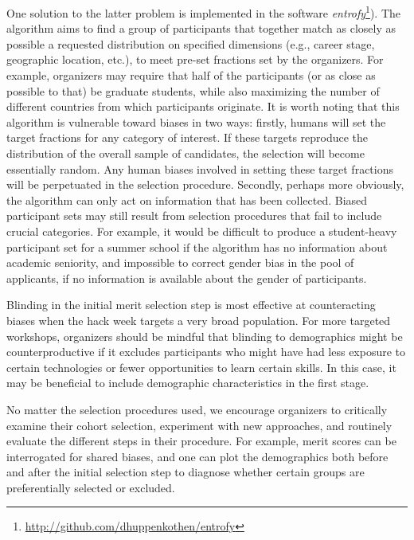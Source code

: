 One solution to the latter problem is implemented in the software \textit{entrofy}\footnote{\url{http://github.com/dhuppenkothen/entrofy}}). 
The algorithm aims to find a group of participants that together match as closely as possible a requested distribution on specified dimensions (e.g., career stage, geographic location, etc.), to meet pre-set fractions set by the organizers.
For example, organizers may require that half of the participants (or as close as possible to that) be graduate students, while also maximizing the number of different countries from which participants originate. 
It is worth noting that this algorithm is vulnerable toward biases in two ways: firstly, humans will set the target fractions for any category of interest.  
If these targets reproduce the distribution of the overall sample of candidates, the selection will become essentially random. 
Any human biases involved in setting these target fractions will be perpetuated in the selection procedure. 
Secondly, perhaps more obviously, the algorithm can only act on information that has been collected.
Biased participant sets may still result from selection procedures that fail to include crucial categories. For example, it would be difficult to produce a student-heavy participant set for a summer school if the algorithm has no information about academic seniority, and impossible to correct gender bias in the pool of applicants, if no information is available about the gender of participants.

Blinding in the initial merit selection step is most effective at counteracting biases when the hack week targets a very broad population. 
For more targeted workshops, organizers should be mindful that blinding to demographics might be counterproductive if it excludes participants who might have had less exposure to certain technologies or fewer opportunities to learn certain skills. 
In this case, it may be beneficial to include demographic characteristics in the first stage. 

No matter the selection procedures used, we encourage organizers to critically examine their cohort selection, experiment with new approaches, and routinely evaluate the different steps in their procedure.  For example, merit scores can be interrogated for shared biases, and one can plot the demographics both before and after the initial selection step to diagnose whether certain groups are preferentially selected or excluded. 



